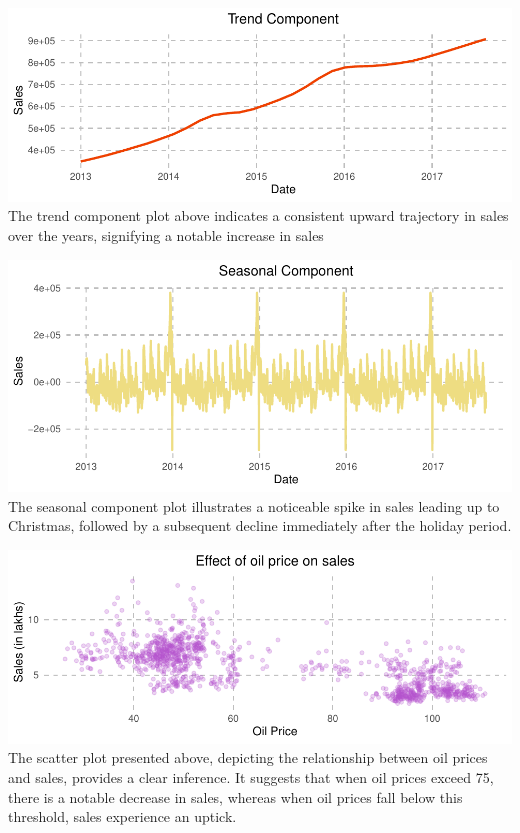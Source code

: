 \documentclass[
]{article}
\begin{document}
\includegraphics{Visualisation-Project_files/figure-latex/Time Series Decomposition-1.pdf}
The trend component plot above indicates a consistent upward trajectory
in sales over the years, signifying a notable increase in sales

\includegraphics{Visualisation-Project_files/figure-latex/unnamed-chunk-2-1.pdf}
The seasonal component plot illustrates a noticeable spike in sales
leading up to Christmas, followed by a subsequent decline immediately
after the holiday period.

\includegraphics{Visualisation-Project_files/figure-latex/Effect of oil Price on sales-1.pdf}
The scatter plot presented above, depicting the relationship between oil
prices and sales, provides a clear inference. It suggests that when oil
prices exceed 75, there is a notable decrease in sales, whereas when oil
prices fall below this threshold, sales experience an uptick.
\end{document}
